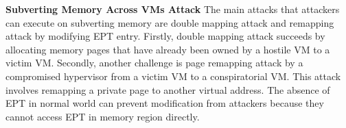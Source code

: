 \documentclass[conference]{IEEEtran}
\begin{document}




\textbf{Subverting Memory Across VMs Attack}
%
The main attacks that attackers can execute on subverting memory are double mapping attack and remapping attack by modifying EPT entry.
Firstly, double mapping attack succeeds by allocating memory pages that have already been owned by a hostile VM to a victim VM. Secondly, another challenge is page remapping attack by a compromised hypervisor from a victim VM to a conspiratorial VM. This attack involves remapping a private page to another virtual address.
The absence of EPT in normal world can prevent modification from attackers because they cannot access EPT in memory region directly.

\end{document}
